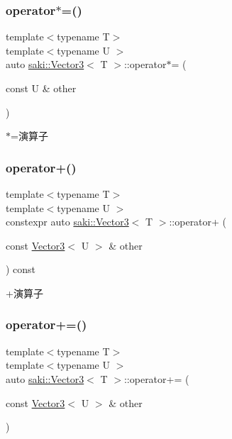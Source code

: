 \subsubsection{\texorpdfstring{operator$\ast$=()}{operator*=()}}
{\footnotesize\ttfamily template$<$typename T$>$ \\
template$<$typename U $>$ \\
auto \mbox{\hyperlink{classsaki_1_1_vector3}{saki\+::\+Vector3}}$<$ T $>$\+::operator$\ast$= (\begin{DoxyParamCaption}\item[{const U \&}]{other }\end{DoxyParamCaption})\hspace{0.3cm}{\ttfamily [inline]}}



$\ast$=演算子 

\mbox{\label{classsaki_1_1_vector3_abd44b15228ed5ac36726acf4952b220e}} 
\subsubsection{\texorpdfstring{operator+()}{operator+()}}
{\footnotesize\ttfamily template$<$typename T$>$ \\
template$<$typename U $>$ \\
constexpr auto \mbox{\hyperlink{classsaki_1_1_vector3}{saki\+::\+Vector3}}$<$ T $>$\+::operator+ (\begin{DoxyParamCaption}\item[{const \mbox{\hyperlink{classsaki_1_1_vector3}{Vector3}}$<$ U $>$ \&}]{other }\end{DoxyParamCaption}) const\hspace{0.3cm}{\ttfamily [inline]}}



+演算子 

\mbox{\label{classsaki_1_1_vector3_a99b24e43486d76b449b23239c80f70d7}} 
\subsubsection{\texorpdfstring{operator+=()}{operator+=()}}
{\footnotesize\ttfamily template$<$typename T$>$ \\
template$<$typename U $>$ \\
auto \mbox{\hyperlink{classsaki_1_1_vector3}{saki\+::\+Vector3}}$<$ T $>$\+::operator+= (\begin{DoxyParamCaption}\item[{const \mbox{\hyperlink{classsaki_1_1_vector3}{Vector3}}$<$ U $>$ \&}]{other }\end{DoxyParamCaption})\hspace{0.3cm}{\ttfamily [inline]}}



